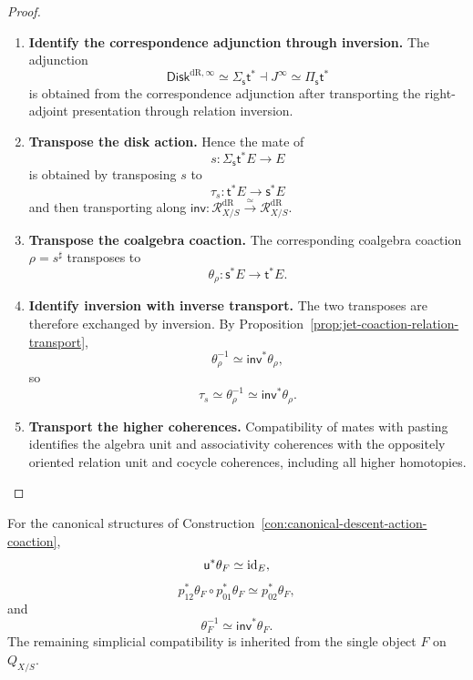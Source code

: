 \begin{proof}
\leavevmode
\begin{enumerate}[label=\textup{(\arabic*)}]
    \item \textbf{Identify the correspondence adjunction through inversion.}
The adjunction
\[
  \mathsf{Disk}^{\mathrm{dR},\infty}\simeq\Sigma_{\mathsf s}\mathsf t^*
  \dashv
  J^\infty\simeq\Pi_{\mathsf s}\mathsf t^*
\]
is obtained from the correspondence adjunction after transporting the
right-adjoint presentation through relation inversion.

    \item \textbf{Transpose the disk action.}
Hence the mate of
\[
  s:\Sigma_{\mathsf s}\mathsf t^*E\to E
\]
is obtained by transposing \(s\) to
\[
  \tau_s:\mathsf t^*E\to \mathsf s^*E
\]
and then transporting along
\(\mathsf{inv}:\mathcal R^{\mathrm{dR}}_{X/S}\xrightarrow{\simeq}\mathcal R^{\mathrm{dR}}_{X/S}\).

    \item \textbf{Transpose the coalgebra coaction.}
The corresponding coalgebra coaction
\(\rho=s^\sharp\) transposes to
\[
  \theta_\rho:\mathsf s^*E\to \mathsf t^*E.
\]

    \item \textbf{Identify inversion with inverse transport.}
The two transposes are therefore exchanged by inversion. By
Proposition~\ref{prop:jet-coaction-relation-transport},
\[
  \theta_\rho^{-1}\simeq\mathsf{inv}^*\theta_\rho,
\]
so
\[
  \tau_s\simeq\theta_\rho^{-1}\simeq\mathsf{inv}^*\theta_\rho.
\]

    \item \textbf{Transport the higher coherences.}
Compatibility of mates with pasting identifies the algebra unit and
associativity coherences with the oppositely oriented relation unit and
cocycle coherences, including all higher homotopies.
\end{enumerate}
\end{proof}

\begin{proposition}
\label{prop:degree-one-transport-cocycle}
For the canonical structures of
Construction~\ref{con:canonical-descent-action-coaction},
\[
  \mathsf u^*\theta_F\simeq\operatorname{id}_E,
\]
\[
  p_{12}^*\theta_F\circ p_{01}^*\theta_F
  \simeq
  p_{02}^*\theta_F,
\]
and
\[
  \theta_F^{-1}\simeq\mathsf{inv}^*\theta_F.
\]
The remaining simplicial compatibility is inherited from the single object
\(F\) on \(Q_{X/S}\).
\end{proposition}

